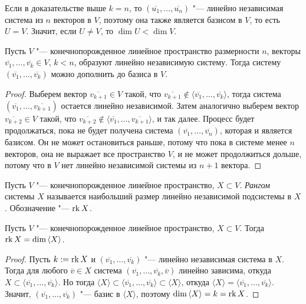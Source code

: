 \begin{note}
	Если в доказательстве выше $k = n$, то $(\overline{u_1}, \dots, \overline{u_n})$ "--- линейно независимая система из $n$ векторов в $V$, поэтому она также является базисом в $V$, то есть $U = V$. Значит, если $U \ne V$, то $\dim{U} < \dim{V}$.
\end{note}

\begin{proposition}
	Пусть $V$ "--- конечнопорожденное линейное пространство размерности $n$, векторы $\overline{v_1}, \dots, \overline{v_k} \in V$, $k < n$, образуют линейно независимую систему. Тогда систему $(\overline{v_1}, \dots, \overline{v_k})$ можно дополнить до базиса в $V$.
\end{proposition}

\begin{proof}
	Выберем вектор $\overline{v_{k+1}} \in V$ такой, что $\overline{v_{k+1}} \not\in \langle\overline{v_1}, \dots, \overline{v_k}\rangle$, тогда система $(\overline{v_1}, \dots, \overline{v_{k+1}})$ остается линейно независимой. Затем аналогично выберем вектор $\overline{v_{k+2}} \in V$ такой, что $\overline{v_{k+2}} \not\in \langle\overline{v_1}, \dots, \overline{v_{k+1}}\rangle$, и так далее. Процесс будет продолжаться, пока не будет получена система $(\overline{v_1}, \dots, \overline{v_n})$, которая и является базисом. Он не может остановиться раньше, потому что пока в системе менее $n$ векторов, она не выражает все пространство $V$, и не может продолжиться дольше, потому что в $V$ нет линейно независимой системы из $n + 1$ вектора.
\end{proof}

\begin{definition}
	Пусть $V$ "--- конечнопорожденное линейное пространство, $X \subset V$. \textit{Рангом} системы $X$ называется наибольший размер линейно независимой подсистемы в $X$. Обозначение "--- $\operatorname{rk}{X}$.
\end{definition}

\begin{proposition}
	Пусть $V$ "--- конечнопорожденное линейное пространство, $X \subset V$. Тогда $\operatorname{rk}{X} = \dim{\langle X\rangle}$.
\end{proposition}

\begin{proof}
	Пусть $k := \operatorname{rk}{X}$ и $(\overline{v_1}, \dots, \overline{v_k})$ "--- линейно независимая система в $X$. Тогда для любого $\overline{v} \in X$ система $(\overline{v_1}, \dots, \overline{v_k}, \overline{v})$ линейно зависима, откуда $X \subset \langle\overline{v_1}, \dots, \overline{v_k}\rangle$. Но тогда $\langle X \rangle \subset \langle\overline{v_1}, \dots, \overline{v_k}\rangle \subset \langle X \rangle$, откуда $\langle X \rangle = \langle\overline{v_1}, \dots, \overline{v_k}\rangle$. Значит, $(\overline{v_1}, \dots, \overline{v_k})$ "--- базис в $\langle X\rangle$, поэтому $\dim{\langle X\rangle} = k \hm{=} \rk{X}$.
\end{proof}

